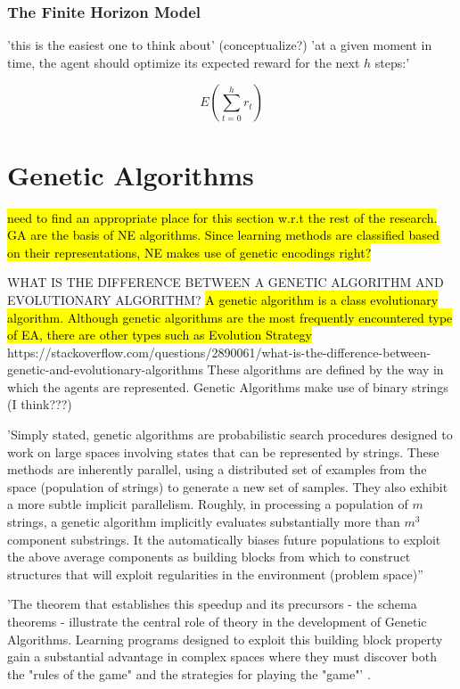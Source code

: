 \subsubsection{The Finite Horizon Model} \cite{KaelblingLittmanMoore1996}
'this is the easiest one to think about' (conceptualize?)
'at a given moment in time, the agent should optimize its expected reward for the next $h$ steps:'

\begin{equation}
E(\sum_{t=0}^{h} r_t)
\end{equation}



\section{Genetic Algorithms}

\hl{need to find an appropriate place for this section w.r.t the rest of the research. GA are the basis of NE algorithms. Since learning methods are classified based on their representations, NE makes use of genetic encodings right?}

WHAT IS THE DIFFERENCE BETWEEN A GENETIC ALGORITHM AND EVOLUTIONARY ALGORITHM?
\hl{A genetic algorithm is a class evolutionary algorithm. Although genetic algorithms are the most frequently encountered type of EA, there are other types such as Evolution Strategy}
https://stackoverflow.com/questions/2890061/what-is-the-difference-between-genetic-and-evolutionary-algorithms
These algorithms are defined by the way in which the agents are represented. Genetic Algorithms make use of binary strings (I think???)



'Simply stated, genetic algorithms are probabilistic search procedures designed to work on large spaces involving states that can be represented by strings. These methods are inherently parallel, using a distributed set of examples from the space (population of strings) to generate a new set of samples. They also exhibit a more subtle implicit parallelism. Roughly, in processing a population of $m$ strings, a genetic algorithm implicitly evaluates substantially more than $m^3$ component substrings. It the automatically biases future populations to exploit the above average components as building blocks from which to construct structures that will exploit regularities in the environment (problem space)'' \cite{goldberg1988genetic}

'The theorem that establishes this speedup and its precursors - the schema theorems - illustrate the central role of theory in the development of Genetic Algorithms. Learning programs designed to exploit this building block property gain a substantial advantage in complex spaces where they must discover both the "rules of the game" and the strategies for playing the "game"' \cite{goldberg1988genetic}.


